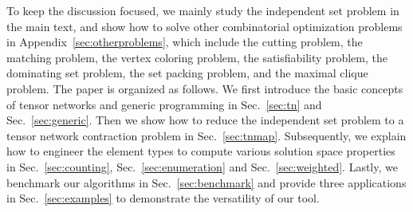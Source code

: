 \documentclass[onefignum, onetabnum]{siamart190516}
\newcommand{\<}{\langle}
\renewcommand{\>}{\rangle}
\newcommand{\Sec}[1]{Sec.~\ref{#1}}
\newcommand{\App}[1]{Appendix~\ref{#1}}
\newcommand{\xpurple}[1]{[{\bf  \color{purple}{\sout{MC: #1}}}]}
\newcounter{example}
\begin{document}
To keep the discussion focused,
we mainly study the independent set problem in the main text, and show how to solve other combinatorial optimization problems in  \App{sec:otherproblems},
which include the cutting problem, the matching problem, the vertex coloring problem, the satisfiability problem, the dominating set problem, the set packing problem, and the maximal clique problem.
The paper is organized as follows.
We first introduce the basic concepts of tensor networks and generic programming in \Sec{sec:tn} and \Sec{sec:generic}.
Then we show how to reduce the independent set problem to a tensor network contraction problem in \Sec{sec:tnmap}. Subsequently, we explain how to engineer the element types to compute various solution space properties in \Sec{sec:counting}, \Sec{sec:enumeration} and \Sec{sec:weighted}. %
Lastly, we benchmark our algorithms in \Sec{sec:benchmark} and provide three applications in \Sec{sec:examples} to demonstrate the versatility of our tool.
\end{document}
